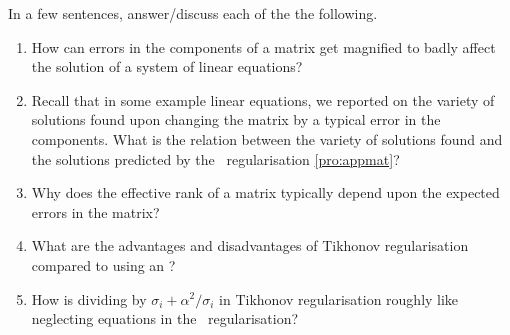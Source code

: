 \begin{exercise} 
In a few sentences, answer\slash discuss each of the the following.
\begin{enumerate}
\item  How can errors in the components of a matrix get magnified to badly affect the solution of a system of linear equations?

\item Recall that in some example linear equations, we reported on the variety of solutions found upon changing the matrix by a typical error in the components. 
What is the relation between the variety of solutions found and the solutions predicted by the \svd\ regularisation \autoref{pro:appmat}?

\item Why does the effective rank of a matrix typically depend upon the expected errors in the matrix?

\item What are the advantages and disadvantages of Tikhonov regularisation compared to using an \svd?

\item How is dividing by \(\sigma_i+\alpha^2/\sigma_i\) in Tikhonov regularisation roughly like neglecting equations in the \svd\ regularisation?

\end{enumerate}
\end{exercise}


\begin{comment}%
why, what caused X?
how did X occur?
what-if? what-if-not?
how does X compare with Y?
what is the evidence for X?
why is X important?
\end{comment}






\begin{comment}
Possible extensions of this chapter include Frobenius norm.  
Possibly link to polar decomposition (Higham86) 
see closestOrthogonalMatrix.png

\begin{exercise} \label{ex:} 
Prove that for every square matrix~\(A\) with \svd\ \(A=\usv\), a closest orthogonal matrix to~\(A\) is~\(U\tr V\) ??
Related to the Kabsch algorithm??
\begin{center}
\TwoD1101
\TwoD{0.89443}{0.44721}{0.44721}{1.34164}%
\TwoD{0.89443}{0.44721}{-0.44721}{0.89443}%
\end{center}
\end{exercise}
\end{comment}


